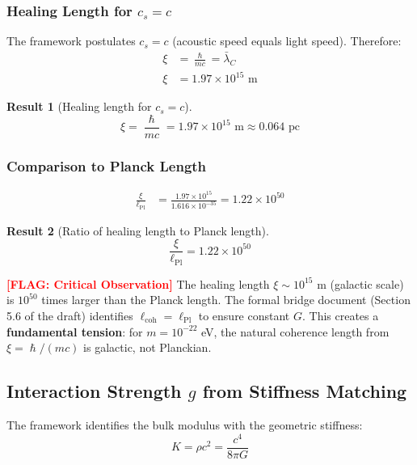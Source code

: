 \documentclass[11pt,a4paper]{article}
\newcommand{\ee}[1]{\times 10^{#1}}
\newcommand{\hbar}{\ensuremath{\hslash}}
\newcommand{\lPl}{\ensuremath{\ell_{\mathrm{Pl}}}}
\newcommand{\FLAG}[1]{\textcolor{red}{\textbf{[FLAG: #1]}}}
\newtheorem{result}{Result}
\begin{document}
\subsubsection{Healing Length for $c_s = c$}

The framework postulates $c_s = c$ (acoustic speed equals light speed). Therefore:
\begin{align}
\xi &= \frac{\hbar}{mc} = \bar{\lambda}_C \nonumber \\
\xi &= 1.97 \ee{15} \text{ m}
\end{align}

\begin{result}[Healing length for $c_s = c$]
\begin{equation}
\boxed{\xi = \frac{\hbar}{mc} = 1.97 \times 10^{15} \text{ m} \approx 0.064 \text{ pc}}
\end{equation}
\end{result}

\subsubsection{Comparison to Planck Length}

\begin{align}
\frac{\xi}{\lPl} &= \frac{1.97 \ee{15}}{1.616 \ee{-35}} = 1.22 \ee{50}
\end{align}

\begin{result}[Ratio of healing length to Planck length]
\begin{equation}
\boxed{\frac{\xi}{\lPl} = 1.22 \times 10^{50}}
\end{equation}
\end{result}

\FLAG{Critical Observation} The healing length $\xi \sim 10^{15}$ m (galactic scale) is $10^{50}$ times larger than the Planck length. The formal bridge document (Section 5.6 of the draft) identifies $\ell_{\mathrm{coh}} = \lPl$ to ensure constant $G$. This creates a \textbf{fundamental tension}: for $m = 10^{-22}$ eV, the natural coherence length from $\xi = \hbar/(mc)$ is galactic, not Planckian.

\subsection{Interaction Strength $g$ from Stiffness Matching}
\label{sec:interaction_g}

The framework identifies the bulk modulus with the geometric stiffness:
\begin{equation}
K = \rho c^2 = \frac{c^4}{8\pi G}
\end{equation}
\end{document}
